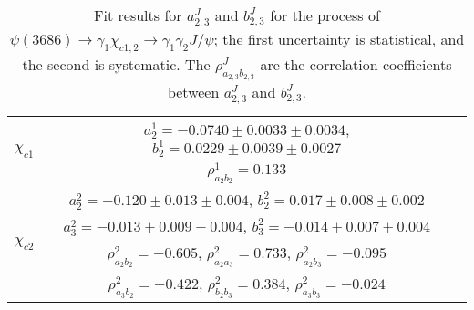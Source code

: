 \documentclass[prd,twocolumn,showpacs,amsmath,amssymb]{revtex4-1}
\begin{document}
\begin{table*}[!htbp]
  \centering
  \caption{\label{chic1_result_sys}Fit results for $a_{2,3}^J$ and $b_{2,3}^J$ for the process of $\psi(3686)\rightarrow\gamma_{1}\chi_{c1,2}\rightarrow\gamma_{1}\gamma_{2}J/\psi$; the first uncertainty is statistical, and the second is systematic. The $\rho_{a_{2,3}b_{2,3}}^{J}$ are the correlation coefficients between $a_{2,3}^J$ and $b_{2,3}^J$.}
\begin{tabular}{c|cc}
\hline
  \multirow{2}{*}{$\chi_{c1}$}     &   $a_2^{1}=-0.0740\pm0.0033\pm0.0034$, $b_2^{1}=0.0229\pm0.0039\pm0.0027$ &\\[0.05in]
                                       &   $\rho_{a_2b_2}^{1} = 0.133$  &\\[0.05in]
\hline
  \multirow{4}{0.2in}{$\chi_{c2}$}     &   $a_2^{2}=-0.120\pm0.013\pm0.004$, $b_2^{2}=0.017\pm0.008\pm0.002$ &\\[0.05in]
       &   $a_3^{2}=-0.013\pm0.009\pm0.004$, $b_3^{2}=-0.014\pm0.007\pm0.004$ &\\[0.05in]
       &   $\rho_{a_2b_2}^{2} = -0.605$, $\rho_{a_2a_3}^{2} = 0.733$, $\rho_{a_2b_3}^{2} = -0.095$ &\\[0.05in]
       &   $\rho_{a_3b_2}^{2} = -0.422$, $\rho_{b_2b_3}^{2} = 0.384$, $\rho_{a_3b_3}^{2} = -0.024$ &\\[0.05in]
\hline
\end{tabular}
\end{table*}
\end{document}
